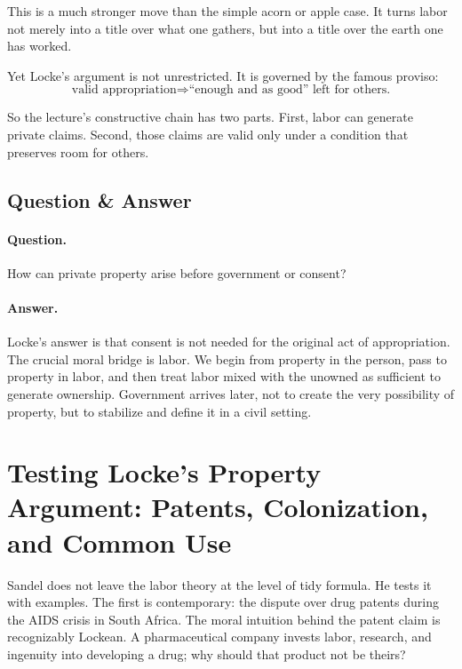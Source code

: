 This is a much stronger move than the simple acorn or apple case. It turns labor not merely into a title over what one gathers, but into a title over the earth one has worked.

Yet Locke's argument is not unrestricted. It is governed by the famous proviso:
\begin{equation}
\text{valid appropriation}\Longrightarrow \text{``enough and as good'' left for others.}
\end{equation}

So the lecture's constructive chain has two parts. First, labor can generate private claims. Second, those claims are valid only under a condition that preserves room for others.

\subsection{Question \& Answer}

\paragraph{Question.} How can private property arise before government or consent?

\paragraph{Answer.} Locke's answer is that consent is not needed for the original act of appropriation. The crucial moral bridge is labor. We begin from property in the person, pass to property in labor, and then treat labor mixed with the unowned as sufficient to generate ownership. Government arrives later, not to create the very possibility of property, but to stabilize and define it in a civil setting.

\section{Testing Locke's Property Argument: Patents, Colonization, and Common Use}

Sandel does not leave the labor theory at the level of tidy formula. He tests it with examples. The first is contemporary: the dispute over drug patents during the AIDS crisis in South Africa. The moral intuition behind the patent claim is recognizably Lockean. A pharmaceutical company invests labor, research, and ingenuity into developing a drug; why should that product not be theirs?


